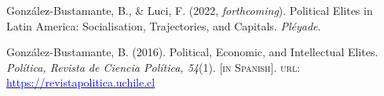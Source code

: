 





\begin{publications}

\begin{benumerate}{2}
\item{\small Gonz\'alez-Bustamante, B., \& Luci, F. (2022, {\itshape forthcoming}). Political Elites in Latin America: Socialisation, Trajectories, and Capitals. {\itshape Pl\'eyade}.}\vspace{1mm}

\item{\small Gonz\'alez-Bustamante, B. (2016). Political, Economic, and Intellectual Elites. {\itshape Pol\'itica, Revista de Ciencia Pol\'itica, 54}(1). {\footnotesize \scshape [in Spanish]}. {\scshape url}: \href{https://revistapolitica.uchile.cl/index.php/RP/issue/view/4365}{\textcolor{blue}{https://revistapolitica.uchile.cl}}} \vspace{1mm}
\end{benumerate}

\end{publications}
